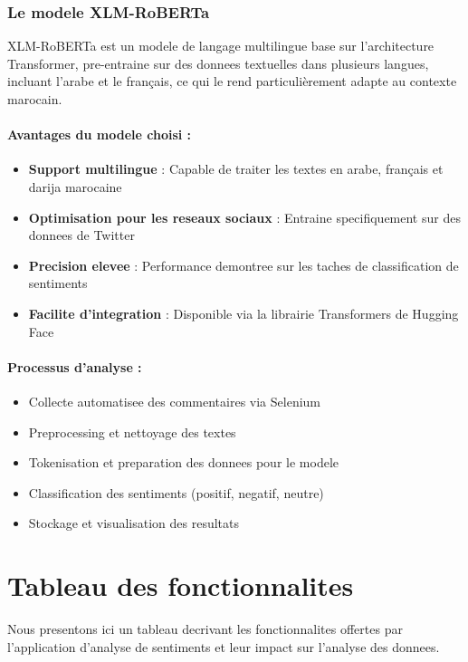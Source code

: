\subsubsection{Le modele XLM-RoBERTa}

XLM-RoBERTa est un modele de langage multilingue base sur l'architecture Transformer, pre-entraine sur des donnees textuelles dans plusieurs langues, incluant l'arabe et le français, ce qui le rend particulièrement adapte au contexte marocain.

\paragraph{Avantages du modele choisi :}
\begin{itemize}
    \item \textbf{Support multilingue} : Capable de traiter les textes en arabe, français et darija marocaine
    \item \textbf{Optimisation pour les reseaux sociaux} : Entraine specifiquement sur des donnees de Twitter
    \item \textbf{Precision elevee} : Performance demontree sur les taches de classification de sentiments
    \item \textbf{Facilite d'integration} : Disponible via la librairie Transformers de Hugging Face
\end{itemize}

\paragraph{Processus d'analyse :}
\begin{itemize}
    \item Collecte automatisee des commentaires via Selenium
    \item Preprocessing et nettoyage des textes
    \item Tokenisation et preparation des donnees pour le modele
    \item Classification des sentiments (positif, negatif, neutre)
    \item Stockage et visualisation des resultats
\end{itemize}

\section{Tableau des fonctionnalites}

Nous presentons ici un tableau decrivant les fonctionnalites offertes par l'application d'analyse de sentiments et leur impact sur l'analyse des donnees.

